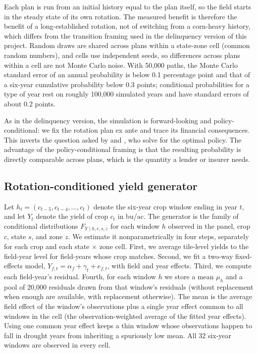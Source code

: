 \documentclass[11pt,letterpaper]{article}
\theoremstyle{remark}
\begin{document}
Each plan is run from an initial history equal to the plan itself, so the field starts in the steady state of its own rotation. The measured benefit is therefore the benefit of a long-established rotation, not of switching from a corn-heavy history, which differs from the transition framing used in the delinquency version of this project. Random draws are shared across plans within a state-zone cell (common random numbers), and cells use independent seeds, so differences across plans within a cell are not Monte Carlo noise. With 50,000 paths, the Monte Carlo standard error of an annual probability is below 0.1 percentage point and that of a six-year cumulative probability below 0.3 points; conditional probabilities for a type of year rest on roughly 100,000 simulated years and have standard errors of about 0.2 points.

As in the delinquency version, the simulation is forward-looking and policy-conditional: we fix the rotation plan ex ante and trace its financial consequences. This inverts the question asked by \citet{Burt1963} and \citet{Livingston2015}, who solve for the optimal policy. The advantage of the policy-conditional framing is that the resulting probability is directly comparable across plans, which is the quantity a lender or insurer needs.

\subsection{\label{subsec:generator}Rotation-conditioned yield generator}

Let $h_t = (c_{t-5}, c_{t-4}, \ldots, c_t)$ denote the six-year crop window ending in year $t$, and let $Y_t$ denote the yield of crop $c_t$ in bu/ac. The generator is the family of conditional distributions $F_{Y \mid h, c, s, z}$ for each window $h$ observed in the panel, crop $c$, state $s$, and zone $z$. We estimate it nonparametrically in four steps, separately for each crop and each state $\times$ zone cell. First, we average tile-level yields to the field-year level for field-years whose crop matches. Second, we fit a two-way fixed-effects model, $Y_{f,t} = \alpha_f + \gamma_t + e_{f,t}$, with field and year effects. Third, we compute each field-year's residual. Fourth, for each window $h$ we store a mean $\mu_h$ and a pool of 20,000 residuals drawn from that window's residuals (without replacement when enough are available, with replacement otherwise). The mean is the average field effect of the window's observations plus a single year effect common to all windows in the cell (the observation-weighted average of the fitted year effects). Using one common year effect keeps a thin window whose observations happen to fall in drought years from inheriting a spuriously low mean. All 32 six-year windows are observed in every cell.
\end{document}
